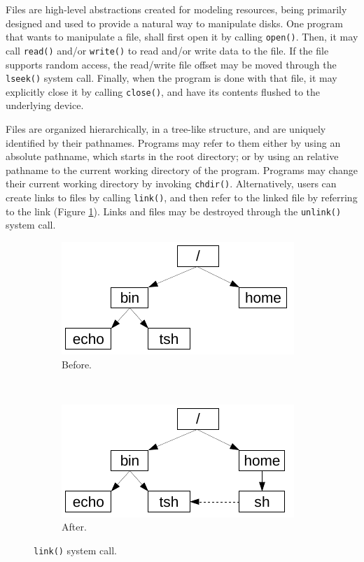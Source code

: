 \documentclass[10pt,a4paper]{article}
\begin{document}
Files are high-level abstractions created for modeling resources, being primarily designed and used to provide a natural way to manipulate disks. One program that wants to manipulate a file, shall first open it by calling \texttt{open()}. Then, it may call \texttt{read()} and/or \texttt{write()} to read and/or write data to the file. If the file supports random access, the read/write file offset may be moved through the \texttt{lseek()} system call. Finally, when the program is done with that file, it may explicitly close it by calling \texttt{close()}, and have its contents flushed to the underlying device.

Files are organized hierarchically, in a tree-like structure, and are uniquely identified by their pathnames. Programs may refer to them either by using an absolute pathname, which starts in the root directory; or by using an relative pathname to the current working directory of the program. Programs may change their current working directory by invoking \texttt{chdir()}. Alternatively, users can create links to files by calling \texttt{link()}, and then refer to the linked file by referring to the link (Figure \ref{figure: link system call}). Links and files may be destroyed through the \texttt{unlink()} system call.

\begin{figure}[b]
	\centering
	\begin{subfigure}[b]{0.35\linewidth}
		\includegraphics[width=\textwidth]{img/link-1}
		\caption{Before.}
	\end{subfigure} ~ 
	\begin{subfigure}[b]{0.35\linewidth}
		\includegraphics[width=\textwidth]{img/link-2}
		\caption{After.}
	\end{subfigure}
	\caption{\texttt{link()} system call.}
	\label{figure: link system call}
\end{figure}
\end{document}
